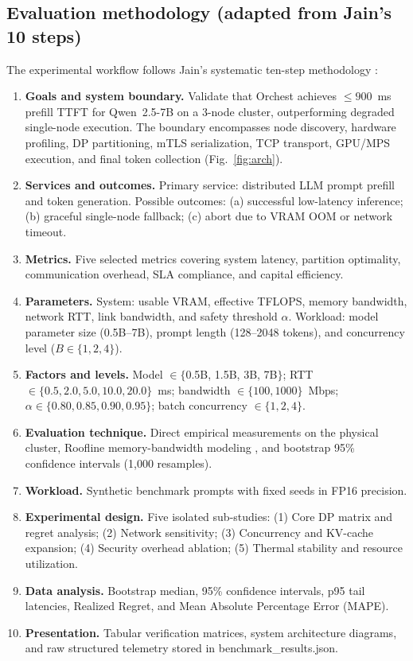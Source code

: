 \documentclass[10pt,a4paper]{article}
\newcommand{\code}[1]{{\ttfamily\footnotesize #1}}
\begin{document}
\subsection{Evaluation methodology (adapted from Jain's 10 steps)}
The experimental workflow follows Jain's systematic ten-step methodology \cite{jain}:
\begin{enumerate}[leftmargin=*]
\item \textbf{Goals and system boundary.} Validate that Orchest achieves $\le 900$~ms prefill TTFT for Qwen~2.5-7B on a 3-node cluster, outperforming degraded single-node execution. The boundary encompasses node discovery, hardware profiling, DP partitioning, mTLS serialization, TCP transport, GPU/MPS execution, and final token collection (Fig.~\ref{fig:arch}).
\item \textbf{Services and outcomes.} Primary service: distributed LLM prompt prefill and token generation. Possible outcomes: (a) successful low-latency inference; (b) graceful single-node fallback; (c) abort due to VRAM OOM or network timeout.
\item \textbf{Metrics.} Five selected metrics covering system latency, partition optimality, communication overhead, SLA compliance, and capital efficiency.
\item \textbf{Parameters.} System: usable VRAM, effective TFLOPS, memory bandwidth, network RTT, link bandwidth, and safety threshold $\alpha$. Workload: model parameter size (0.5B--7B), prompt length (128--2048 tokens), and concurrency level ($B \in \{1, 2, 4\}$).
\item \textbf{Factors and levels.} Model $\in\{$0.5B, 1.5B, 3B, 7B$\}$; RTT $\in\{0.5, 2.0, 5.0, 10.0, 20.0\}$~ms; bandwidth $\in\{100, 1000\}$~Mbps; $\alpha\in\{0.80, 0.85, 0.90, 0.95\}$; batch concurrency $\in\{1, 2, 4\}$.
\item \textbf{Evaluation technique.} Direct empirical measurements on the physical cluster, Roofline memory-bandwidth modeling \cite{roofline}, and bootstrap 95\% confidence intervals (1,000 resamples).
\item \textbf{Workload.} Synthetic benchmark prompts with fixed seeds in FP16 precision.
\item \textbf{Experimental design.} Five isolated sub-studies: (1) Core DP matrix and regret analysis; (2) Network sensitivity; (3) Concurrency and KV-cache expansion; (4) Security overhead ablation; (5) Thermal stability and resource utilization.
\item \textbf{Data analysis.} Bootstrap median, 95\% confidence intervals, p95 tail latencies, Realized Regret, and Mean Absolute Percentage Error (MAPE).
\item \textbf{Presentation.} Tabular verification matrices, system architecture diagrams, and raw structured telemetry stored in \code{benchmark\_results.json}.
\end{enumerate}
\end{document}
